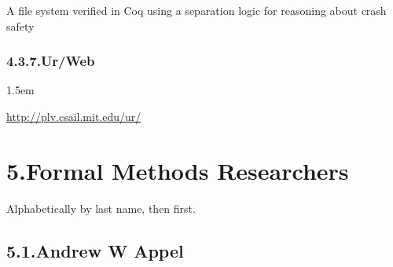 \documentclass[12pt,twoside]{article}
\begin{document}
\noindent{}A file system verified in Coq using a separation logic for reasoning about crash safety%

\subsubsection{4.3.7.\hspace*{0.5em}Ur/Web}%

\begin{mddefinitions}%


\begin{mdbmarginx}{}{}{}{1.5em}%
\begin{mddefdata}%
\href{http://plv.csail.mit.edu/ur/}{{\ttfamily http://\hspace{0pt}plv.\hspace{0pt}csail.\hspace{0pt}mit.\hspace{0pt}edu/\hspace{0pt}ur/\hspace{0pt}}}%
\end{mddefdata}%
\end{mdbmarginx}%
\end{mddefinitions}%

\section{5.\hspace*{0.5em}Formal Methods Researchers}%

\noindent{}Alphabetically by last name, then first.%

\subsection{5.1.\hspace*{0.5em}Andrew W Appel}%
\end{document}

